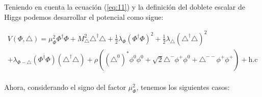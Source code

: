\documentclass[12pt]{article}
\begin{document}
Teniendo en cuenta la ecuación (\ref{eq:11})  y la definición del doblete escalar de  Higgs podemos desarrollar el potencial como sigue: 



\begin{equation}
    \begin{aligned}
    \label{eq:POtencialMAjorana1}
V(\Phi, \triangle)= \mu^2_\Phi\Phi^\dagger\Phi + M^2_\triangle\triangle^\dagger\triangle +  \frac{1}{2}\lambda_\Phi (\Phi^\dagger\Phi)^2 + 
\frac{1}{2}\lambda_\triangle (\triangle^\dagger\triangle)^2 \\ 
+ \lambda_{\Phi-\triangle} (\Phi^\dagger\Phi)(\triangle^\dagger\triangle)
+ \rho((\triangle^{0})^*\phi^0\phi^0 + \sqrt{2}\triangle^-\phi^+\phi^0+\triangle^{--}\phi^{+}\phi^{+} ) + \text{h.c}
    \end{aligned}
\end{equation} \\


Ahora, considerando el signo del factor $\mu^2_\Phi$, tenemos los siguientes casos:
\end{document}
